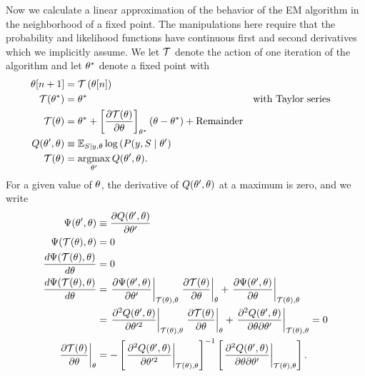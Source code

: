 \newcommand{\OldParameters}{\parameters}
\newcommand{\NewParameters}{\parameters'}
Now we calculate a linear approximation of the behavior of the EM
algorithm in the neighborhood of a fixed point.  The manipulations
here require that the probability and likelihood functions have
continuous first and second derivatives which we implicitly assume.
We let $\EMmap$ denote the action of one iteration of the algorithm and
let ${\theta^*}$ denote a fixed point with
\begin{align*}
  \ti{\parameters}{n+1} &= \EMmap\left( \ti{\parameters}{n} \right) \\
  \EMmap(\EMfixedPoint) &= \EMfixedPoint && \text{with Taylor series} \\
  \EMmap(\parameters) &= \EMfixedPoint + \left[ \frac{\partial
                 \EMmap(\parameters)}{\partial \parameters} \right]_{\EMfixedPoint} (\parameters - \EMfixedPoint) + \text{Remainder} \\
  Q(\NewParameters, \OldParameters) &\equiv \EV_{S \given y,\OldParameters} \log\left(P(y,S \given
  \NewParameters \right) \\
  \EMmap(\OldParameters) &= \argmax_{\NewParameters} Q(\NewParameters, \OldParameters). 
\end{align*}
For a given value of $\OldParameters$, the derivative of $Q(\NewParameters,
\OldParameters)$ at a maximum is zero, and we write
\begin{align}
  \nonumber
  \Psi(\NewParameters,\OldParameters)
  &\equiv \frac{\partial Q(\NewParameters,
    \OldParameters)}{\partial \NewParameters} \\
  \nonumber
  \Psi(\EMmap(\OldParameters), \OldParameters)
  &= 0 \\
  \nonumber
  \frac{d\Psi(\EMmap(\OldParameters), \OldParameters)}{d \OldParameters}
  &= 0 \\
  \nonumber
  \frac{d\Psi(\EMmap(\OldParameters), \OldParameters)}{d \OldParameters}
  &= \left. \frac{\partial \Psi(\NewParameters, \OldParameters)}{\partial \NewParameters}
    \right|_{\EMmap(\OldParameters), \OldParameters} \left.\frac{\partial
    \EMmap(\theta)}{\partial \theta} \right|_{\OldParameters} +
    \left. \frac{\partial \Psi(\NewParameters, \OldParameters)}{\partial \OldParameters}
    \right|_{\EMmap(\OldParameters), \OldParameters} \\
  \nonumber
  &= \left. \frac{\partial^2 Q(\NewParameters, \OldParameters)}{\partial \NewParameters^2}
    \right|_{\EMmap(\OldParameters), \OldParameters} \left.\frac{\partial
    \EMmap(\theta)}{\partial \theta} \right|_{\OldParameters} +
    \left. \frac{\partial^2 Q(\NewParameters, \OldParameters)}{\partial \OldParameters
    \partial \NewParameters} \right|_{\EMmap(\OldParameters), \OldParameters} =0 \\
  \label{eq:two_second_derivatives}
  \left.\frac{\partial \EMmap(\theta)}{\partial \theta}
  \right|_{\OldParameters}
  &= - \left[ \left. \frac{\partial^2 Q(\NewParameters,  \OldParameters)}{\partial
    \NewParameters^2} \right|_{\EMmap(\OldParameters), \OldParameters} \right]^{-1} \left[
    \left. \frac{\partial^2 Q(\NewParameters, \OldParameters)}{\partial \OldParameters
    \partial \NewParameters} \right|_{\EMmap(\OldParameters), \OldParameters} \right].
\end{align}

